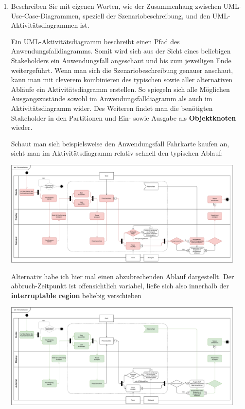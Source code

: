 \documentclass{article}
\newcommand{\gqq}[1]{\glqq{}#1\grqq{}}
\begin{document}
\begin{enumerate}[label=\alph*.]
        \newpage
        \item Beschreiben Sie mit eigenen Worten, wie der Zusammenhang zwischen UML-Use-Case-Diagrammen, speziell der Szenariobeschreibung, und den UML-Aktivitätsdiagrammen ist.

            \begin{displayquote}
                Ein UML-Aktivitätsdiagramm beschreibt einen Pfad des Anwendungsfalldiagramms.
                Somit wird sich aus der Sicht eines beliebigen Stakeholders ein Anwendungsfall angeschaut und bis zum jeweiligen Ende weitergeführt.
                Wenn man sich die Szenariobeschreibung genauer anschaut, kann man mit cleverem kombinieren des typischen sowie aller alternativen Abläufe ein Aktivitätsdiagramm erstellen.
                So spiegeln sich alle Möglichen Ausgangszustände sowohl im Anwendungsfalldiagramm als auch im Aktivitätsdiagramm wider.
                Des Weiteren findet man die benötigten Stakeholder in den Partitionen und Ein- sowie Ausgabe als \textbf{Objektknoten} wieder.

                \vspace{1em}
                Schaut man sich beispielsweise den Anwendungsfall \gqq{Fahrkarte kaufen} an, sieht man im Aktivitätsdiagramm relativ schnell den typischen Ablauf:
                
                \vspace{1em}
                \includegraphics[width=0.95\textwidth]{swt_wende_tim_h04_activity_diagram_typical.pdf}
                \vspace{1em}

                Alternativ habe ich hier mal einen abzubrechenden Ablauf dargestellt.
                Der abbruch-Zeitpunkt ist offensichtlich variabel, ließe sich also innerhalb der \textbf{interruptable region} beliebig verschieben

                \vspace{1em}
                \includegraphics[width=0.95\textwidth]{swt_wende_tim_h04_activity_diagram_abort.pdf}
            \end{displayquote}


\end{enumerate}
\end{document}
